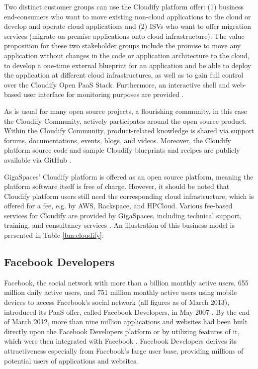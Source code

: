 Two distinct customer groups can use the Cloudify platform offer: (1) business end-consumers who want to move existing non-cloud applications to the cloud or develop and operate cloud applications and (2) \acp{ISV} who want to offer migration services (migrate on-premise applications onto cloud infrastructure). The value proposition for these two stakeholder groups include the promise to move any application without changes in the code or application architecture to the cloud, to develop a one-time external blueprint for an application and be able to deploy the application at different cloud infrastructures, as well as to gain full control over the Cloudify Open \ac{PaaS} Stack. Furthermore, an interactive shell and web-based user interface for monitoring purposes are provided \citep{GigaSpaces2013a}.

As is usual for many open source projects, a flourishing community, in this case the Cloudify Community, actively participates around the open source product. Within the Cloudify Community, product-related knowledge is shared via support forums, documentations, events, blogs, and videos. Moreover, the Cloudify platform source code and sample Cloudify blueprints and recipes are publicly available via GitHub \citep{GigaSpaces2013b,GitHub2013,GitHub2013a}.

GigaSpaces' Cloudify platform is offered as an open source platform, meaning the platform software itself is free of charge. However, it should be noted that Cloudify platform users still need the corresponding cloud infrastructure, which is offered for a fee, e.g. by \ac{AWS}, Rackspace, and HPCloud. Various fee-based services for Cloudify are provided by GigaSpaces, including technical support, training, and consultancy services \citep{GigaSpaces2013a}. An illustration of this business model is presented in Table \ref{bm:cloudify}:



\subsection{Facebook Developers}\label{ch:sota:fd}

Facebook, the social network with more than a billion monthly active users, 655 million daily active users, and 751 million monthly active users using mobile devices to access Facebook's social network (all figures as of March 2013), introduced its \ac{PaaS} offer, called Facebook Developers, in May 2007 \citep{Facebook2013}. By the end of March 2012, more than nine million applications and websites had been built directly upon the Facebook Developers platform or by utilizing features of it, which were then integrated with Facebook \citep{Facebook2013}. Facebook Developers derives its attractiveness especially from Facebook's large user base,  providing millions of potential users of applications and websites.

